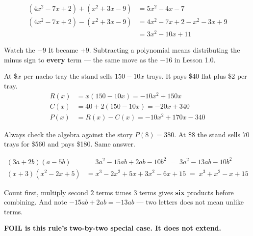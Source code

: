 \documentclass[aspectratio=169, 11pt]{beamer}
\begin{document}
\begin{frame}[t, plain]
  \[
  \begin{aligned}
    \left(4x^2-7x+2\right)+\left(x^2+3x-9\right) &= 5x^2-4x-7 \\[6pt]
    \left(4x^2-7x+2\right)-\left(x^2+3x-9\right) &= 4x^2-7x+2-x^2-3x+9 \\
                                                 &= 3x^2-10x+11
  \end{aligned}
  \]
  \begin{block}{Watch the $-9$}
    It became $+9$. Subtracting a polynomial means distributing the minus sign to
    \textbf{every} term --- the same move as the $-16$ in Lesson 1.0.
  \end{block}
\end{frame}

\begin{frame}[t, plain]
  At \$$x$ per nacho tray the stand sells $150-10x$ trays. It pays \$40 flat plus \$2 per tray.
  \[
  \begin{aligned}
    R(x) &= x(150-10x) = -10x^2+150x \\
    C(x) &= 40+2(150-10x) = -20x+340 \\
    P(x) &= R(x)-C(x) = -10x^2+170x-340
  \end{aligned}
  \]
  \begin{block}{Always check the algebra against the story}
    $P(8)=380$. At \$8 the stand sells $70$ trays for \$560 and pays \$180. Same answer.
  \end{block}
\end{frame}

\begin{frame}[t, plain]
  \[
  \begin{aligned}
    (3a+2b)(a-5b)              &= 3a^2-15ab+2ab-10b^2 \;=\; 3a^2-13ab-10b^2 \\[4pt]
    (x+3)\left(x^2-2x+5\right) &= x^3-2x^2+5x+3x^2-6x+15 \;=\; x^3+x^2-x+15
  \end{aligned}
  \]
  \begin{block}{Count first, multiply second}
    $2$ terms times $3$ terms gives \textbf{six} products before combining. And note
    $-15ab+2ab=-13ab$ --- two letters does not mean unlike terms.
  \end{block}
  {\color{goldacc}\bfseries FOIL is this rule's two-by-two special case. It does not extend.}
\end{frame}
\end{document}
